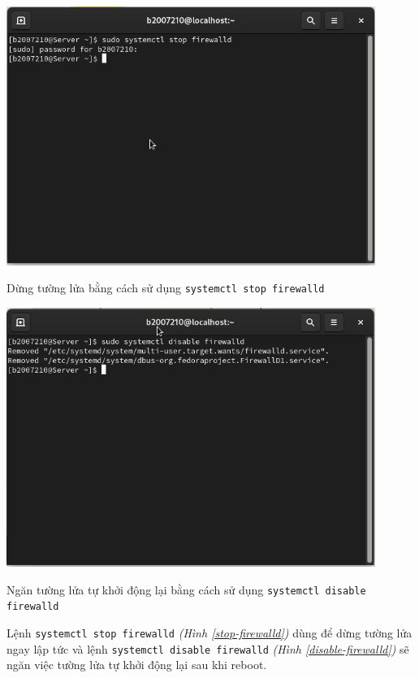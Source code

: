 \documentclass[a4paper, 11pt]{article}
\begin{document}
\begin{itemize}
          \begin{minipage}
              {\linewidth}
              \captionsetup{type=figure}
              \centering
              \includegraphics[width=12cm]{images/stop-firewalld.png}
              \caption{Dừng tường lửa bằng cách sử dụng \texttt{systemctl stop firewalld}}
              \label{stop-firewalld}
          \end{minipage}

          \begin{minipage}
              {\linewidth}
              \captionsetup{type=figure}
              \centering
              \includegraphics[width=12cm]{images/disable-firewalld.png}
              \caption{Ngăn tường lửa tự khởi động lại bằng cách sử dụng \texttt{systemctl disable firewalld}}
              \label{disable-firewalld}
          \end{minipage}

          Lệnh \texttt{systemctl stop firewalld} \textit{(Hình \ref{stop-firewalld})} dùng để dừng tường lửa ngay lập tức và lệnh \texttt{systemctl disable firewalld} \textit{(Hình \ref{disable-firewalld})} sẽ ngăn việc tường lửa tự khởi động lại sau khi reboot.
\end{itemize}
\end{document}
